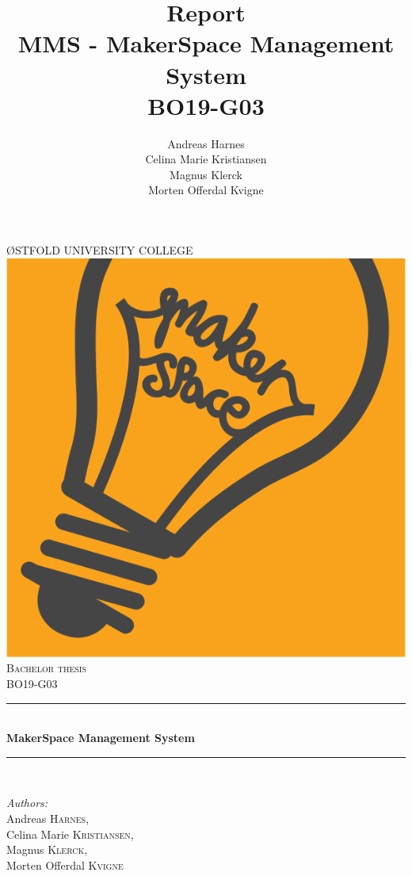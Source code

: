 \documentclass[12pt]{report}
\title {
    Report \\
    MMS - MakerSpace Management System \\
    BO19-G03
}
\author {
    Andreas Harnes \\
    Celina Marie Kristiansen \\
    Magnus Klerck \\
    Morten Offerdal Kvigne
}
\begin{document}
\begin{titlepage}

\newcommand{\HRule}{\rule{\linewidth}{0.5mm}} %

\center %

\textsc{\LARGE ØSTFOLD UNIVERSITY COLLEGE}\\[1.5cm] %
\includegraphics[scale=.1]{images/makerspace_logo.png}\\[1cm] %
\textsc{\Large Bachelor thesis}\\[0.5cm] %
\textsc{\large BO19-G03}\\[0.5cm] %

\HRule \\[0.4cm]
{ \huge \bfseries MakerSpace Management System}\\[0.4cm] %
\HRule \\[1.5cm]
 
\begin{minipage}{0.8\textwidth}
\begin{flushleft} \large
\emph{Authors:}\\
Andreas \textsc{Harnes},\\
Celina Marie \textsc{Kristiansen},\\
Magnus \textsc{Klerck},\\
Morten Offerdal \textsc{Kvigne}\\%
\end{flushleft}


\end{minipage}
\end{titlepage}
\end{document}
